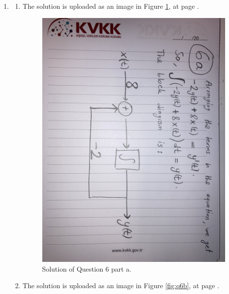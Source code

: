 \documentclass[10pt,a4paper, margin=1in]{article}
\begin{document}
\begin{enumerate}
\item %
    \begin{enumerate}
    \item %
    The solution is uploaded as an image in Figure \ref{fig:q6a}, at page \pageref{fig:q6a}.
    \begin{figure}[htbp]
        \centering
        \includegraphics[width=1\linewidth]{q6a.jpg}
        \caption{Solution of Question 6 part a.}
        \label{fig:q6a}
    \end{figure}
    \item %
    The solution is uploaded as an image in Figure \ref{fig:q6b}, at page \pageref{fig:q6b}.
    \begin{figure}[htbp]
        \centering

\end{figure}
\end{enumerate}
\end{enumerate}
\end{document}
